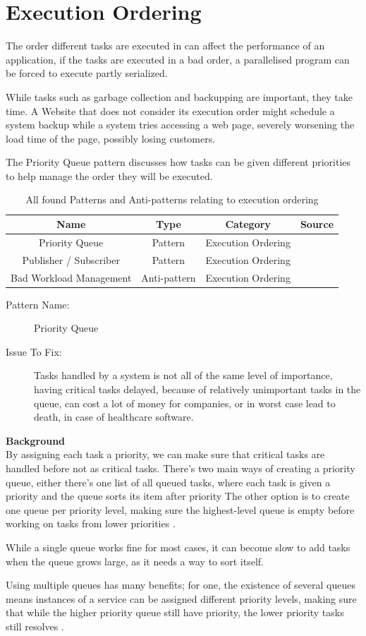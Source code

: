 \documentclass[a4paper,UKenglish]{dagrep}
\newcommand{\pattern}[6]{
\begin{center}
  \begin{patt}
    \begin{description}
      \item[Pattern Name:]#1
      \ifthenelse{#2 = 0}{~}{\item[Also Known As:]#3}
      \item[Issue To Fix:]#5
    \end{description}
  \end{patt}
\end{center}
  \textbf{Background}\\#6

  }
\begin{document}
\section{Execution Ordering}

The order different tasks are executed in can affect the performance of an application, if the tasks are executed in a bad order, a parallelised program can be forced to execute partly serialized.

While tasks such as garbage collection and backupping are important, they take time. A Website that does not consider its execution order might schedule a system backup while a system tries accessing a web page, severely worsening the load time of the page, possibly losing customers.

The Priority Queue pattern discusses how tasks can be given different priorities to help manage the order they will be executed.

\begin{table}[H]
	\begin{tabular}{c|ccc}
		Name                       & Type    & Category           & Source                                    \\\hline
		Priority Queue             & Pattern & Execution Ordering & \cite{microsoft2024performanceefficiency} \\
		Publisher / Subscriber     & Pattern & Execution Ordering & \cite{microsoft2024performanceefficiency} \\
		Bad Workload Management           & Anti-pattern & Execution Ordering & \cite{tate2002bitter}                                   \\
	\end{tabular}
	\caption{All found Patterns and Anti-patterns relating to execution ordering}
	\label{tab:patterns}
\end{table}

\pattern{Priority Queue \cite{microsoft2024performanceefficiency}}{0}{}{}{
	Tasks handled by a system is not all of the same level of importance, having critical tasks delayed, because of relatively unimportant tasks in the queue, can cost a lot of money for companies, or in worst case lead to death, in case of healthcare software.
}{
	By assigning each task a priority, we can make sure that critical tasks are handled before not as critical tasks. There's two main ways of creating a priority queue, either there's one list of all queued tasks, where each task is given a priority and the queue sorts its item after priority The other option is to create one queue per priority level, making sure the highest-level queue is empty before working on tasks from lower priorities \cite{microsoft2024performanceefficiency}.

	While a single queue works fine for most cases, it can become slow to add tasks when the queue grows large, as it needs a way to sort itself.

	Using multiple queues has many benefits; for one, the existence of several queues means instances of a service can be assigned different priority levels, making sure that while the higher priority queue still have priority, the lower priority tasks still resolves \cite{microsoft2024performanceefficiency}.
}
\end{document}
